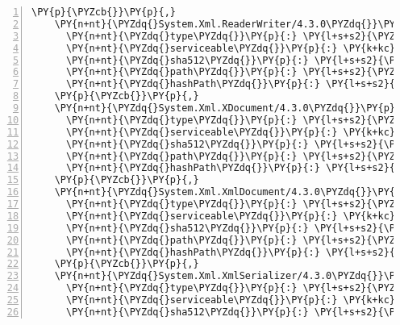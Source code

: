 \begin{Verbatim}[commandchars=\\\{\},numbers=left,firstnumber=1,stepnumber=1,numberblanklines=0]
    \PY{p}{\PYZcb{}}\PY{p}{,}
    \PY{n+nt}{\PYZdq{}System.Xml.ReaderWriter/4.3.0\PYZdq{}}\PY{p}{:} \PY{p}{\PYZob{}}
      \PY{n+nt}{\PYZdq{}type\PYZdq{}}\PY{p}{:} \PY{l+s+s2}{\PYZdq{}package\PYZdq{}}\PY{p}{,}
      \PY{n+nt}{\PYZdq{}serviceable\PYZdq{}}\PY{p}{:} \PY{k+kc}{true}\PY{p}{,}
      \PY{n+nt}{\PYZdq{}sha512\PYZdq{}}\PY{p}{:} \PY{l+s+s2}{\PYZdq{}sha512\PYZhy{}GrprA+Z0RUXaR4N7/eW71j1rgMnEnEVlgii49GZyAjTH7uliMnrOU3HNFBr6fEDBCJCIdlVNq9hHbaDR621XBA==\PYZdq{}}\PY{p}{,}
      \PY{n+nt}{\PYZdq{}path\PYZdq{}}\PY{p}{:} \PY{l+s+s2}{\PYZdq{}system.xml.readerwriter/4.3.0\PYZdq{}}\PY{p}{,}
      \PY{n+nt}{\PYZdq{}hashPath\PYZdq{}}\PY{p}{:} \PY{l+s+s2}{\PYZdq{}system.xml.readerwriter.4.3.0.nupkg.sha512\PYZdq{}}
    \PY{p}{\PYZcb{}}\PY{p}{,}
    \PY{n+nt}{\PYZdq{}System.Xml.XDocument/4.3.0\PYZdq{}}\PY{p}{:} \PY{p}{\PYZob{}}
      \PY{n+nt}{\PYZdq{}type\PYZdq{}}\PY{p}{:} \PY{l+s+s2}{\PYZdq{}package\PYZdq{}}\PY{p}{,}
      \PY{n+nt}{\PYZdq{}serviceable\PYZdq{}}\PY{p}{:} \PY{k+kc}{true}\PY{p}{,}
      \PY{n+nt}{\PYZdq{}sha512\PYZdq{}}\PY{p}{:} \PY{l+s+s2}{\PYZdq{}sha512\PYZhy{}5zJ0XDxAIg8iy+t4aMnQAu0MqVbqyvfoUVl1yDV61xdo3Vth45oA2FoY4pPkxYAH5f8ixpmTqXeEIya95x0aCQ==\PYZdq{}}\PY{p}{,}
      \PY{n+nt}{\PYZdq{}path\PYZdq{}}\PY{p}{:} \PY{l+s+s2}{\PYZdq{}system.xml.xdocument/4.3.0\PYZdq{}}\PY{p}{,}
      \PY{n+nt}{\PYZdq{}hashPath\PYZdq{}}\PY{p}{:} \PY{l+s+s2}{\PYZdq{}system.xml.xdocument.4.3.0.nupkg.sha512\PYZdq{}}
    \PY{p}{\PYZcb{}}\PY{p}{,}
    \PY{n+nt}{\PYZdq{}System.Xml.XmlDocument/4.3.0\PYZdq{}}\PY{p}{:} \PY{p}{\PYZob{}}
      \PY{n+nt}{\PYZdq{}type\PYZdq{}}\PY{p}{:} \PY{l+s+s2}{\PYZdq{}package\PYZdq{}}\PY{p}{,}
      \PY{n+nt}{\PYZdq{}serviceable\PYZdq{}}\PY{p}{:} \PY{k+kc}{true}\PY{p}{,}
      \PY{n+nt}{\PYZdq{}sha512\PYZdq{}}\PY{p}{:} \PY{l+s+s2}{\PYZdq{}sha512\PYZhy{}lJ8AxvkX7GQxpC6GFCeBj8ThYVyQczx2+f/cWHJU8tjS7YfI6Cv6bon70jVEgs2CiFbmmM8b9j1oZVx0dSI2Ww==\PYZdq{}}\PY{p}{,}
      \PY{n+nt}{\PYZdq{}path\PYZdq{}}\PY{p}{:} \PY{l+s+s2}{\PYZdq{}system.xml.xmldocument/4.3.0\PYZdq{}}\PY{p}{,}
      \PY{n+nt}{\PYZdq{}hashPath\PYZdq{}}\PY{p}{:} \PY{l+s+s2}{\PYZdq{}system.xml.xmldocument.4.3.0.nupkg.sha512\PYZdq{}}
    \PY{p}{\PYZcb{}}\PY{p}{,}
    \PY{n+nt}{\PYZdq{}System.Xml.XmlSerializer/4.3.0\PYZdq{}}\PY{p}{:} \PY{p}{\PYZob{}}
      \PY{n+nt}{\PYZdq{}type\PYZdq{}}\PY{p}{:} \PY{l+s+s2}{\PYZdq{}package\PYZdq{}}\PY{p}{,}
      \PY{n+nt}{\PYZdq{}serviceable\PYZdq{}}\PY{p}{:} \PY{k+kc}{true}\PY{p}{,}
      \PY{n+nt}{\PYZdq{}sha512\PYZdq{}}\PY{p}{:} \PY{l+s+s2}{\PYZdq{}sha512\PYZhy{}MYoTCP7EZ98RrANESW05J5ZwskKDoN0AuZ06ZflnowE50LTpbR5yRg3tHckTVm5j/m47stuGgCrCHWePyHS70Q==\PYZdq{}}\PY{p}{,}

\end{Verbatim}
